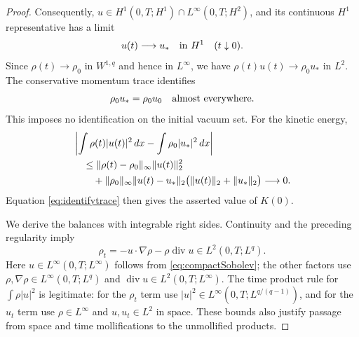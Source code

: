 \documentclass[10pt,twoside]{article}
\newcommand{\dd}{\,dx}
\newcommand{\Div}{\operatorname{div}}
\newcommand{\norm}[2]{\lVert#1\rVert_{#2}}
\begin{document}
\begin{proof}
Consequently,
$u\in H^1(0,T;H^1)\cap L^\infty(0,T;H^2)$, and its continuous
$H^1$ representative has a limit
\begin{equation}
 u(t)\longrightarrow u_*
       \quad\hbox{in }H^1\quad(t\downarrow0).
 \label{eq:velocitytrace}
\end{equation}
Since $\rho(t)\to\rho_0$ in $W^{1,q}$ and hence in $L^\infty$,
we have $\rho(t)u(t)\to\rho_0u_*$ in $L^2$.
The conservative momentum trace identifies
\begin{equation}
 \rho_0u_*=\rho_0u_0\quad\hbox{almost everywhere}.
 \label{eq:identifytrace}
\end{equation}
This imposes no identification on the initial vacuum set. For the
kinetic energy,
\begin{align}
 &\left|\int\rho(t)|u(t)|^2\dd-\int\rho_0|u_*|^2\dd\right|\notag\\
 &\quad\le
 \norm{\rho(t)-\rho_0}{\infty}\norm{u(t)}{2}^2\notag\\
 &\qquad
   +\norm{\rho_0}{\infty}\norm{u(t)-u_*}{2}
           \bigl(\norm{u(t)}{2}+\norm{u_*}{2}\bigr)
 \longrightarrow0.
 \label{eq:kinetictrace}
\end{align}
Equation \eqref{eq:identifytrace} then gives the asserted value of
$K(0)$.

We derive the balances with integrable right sides. Continuity and
the preceding regularity imply
\begin{equation}
 \rho_t=-u\cdot\nabla\rho-\rho\Div u
       \in L^2(0,T;L^q).
 \label{eq:densitytime}
\end{equation}
Here $u\in L^\infty(0,T;L^\infty)$ follows from
\eqref{eq:compactSobolev}; the other factors use
$\rho,\nabla\rho\in L^\infty(0,T;L^q)$ and
$\Div u\in L^2(0,T;L^\infty)$.
The time product rule for $\int\rho|u|^2$ is legitimate:
for the $\rho_t$ term use
$|u|^2\in L^\infty(0,T;L^{q/(q-1)})$, and for the $u_t$ term
use $\rho\in L^\infty$ and $u,u_t\in L^2$ in space.
These bounds also justify passage from space and time
mollifications to the unmollified products.


\end{proof}
\end{document}
